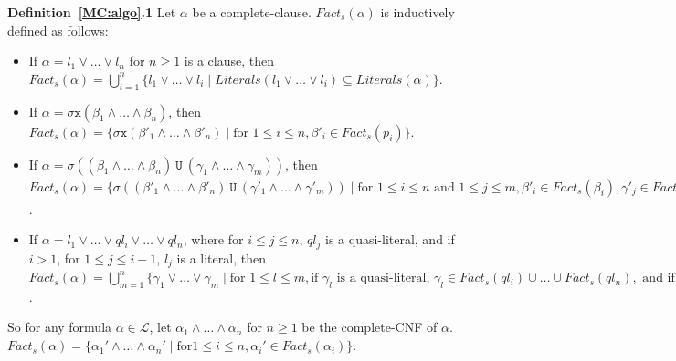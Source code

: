 \documentclass{entcs}
\begin{document}
\noindent\textbf{Definition~\ref{MC:algo}.1} Let $\alpha$ be a
complete-clause. $Fact_{s}(\alpha)$ is inductively defined as
follows:\small
\begin{itemize}
\item If $\alpha=l_1\vee\ldots\vee l_n$ for $n\geq 1$ is a clause,
then $Fact_s(\alpha)=\bigcup\limits_{i=1}^n\{ l_1\vee\ldots\vee
l_i\; |\; Literals(l_1\vee\ldots\vee l _i)\subseteq
Literals(\alpha) \}$. \item If
$\alpha=\sigma\texttt{x}(\beta_1\wedge\ldots\wedge \beta_n)$, then
$Fact_s(\alpha)=\{\sigma\texttt{x}(\beta'_1\wedge\ldots\wedge
\beta'_n)\; |\; \mbox{for }1\leq i\leq n, \beta'_i \in
Fact_s(p_i)\}$. \item If $\alpha=\sigma((\beta_1\wedge\ldots\wedge
\beta_n)\ \texttt{U}\ (\gamma_1\wedge\ldots\wedge \gamma_m))$,
then $Fact_s(\alpha)= \{\sigma((\beta'_1\wedge\ldots\wedge
\beta'_n)\ \texttt{U}\ (\gamma'_1\wedge\ldots\wedge \gamma'_m))\;
|\; \mbox{for }1\leq i\leq n \mbox{ and }1\leq j\leq m,
\beta'_i\in Fact_s(\beta_i),\gamma'_j\in Fact_s(\gamma_j)\}$.
\item If $\alpha=l_1\vee\ldots\vee ql_i\vee\ldots\vee ql_n$, where
for $i\leq j\leq n$, $ql_j$ is a quasi-literal, and if $i>1$, for
$1\leq j\leq i-1$, $l_j$ is a literal, then
$Fact_s(\alpha)=\bigcup\limits_{m=1}^n\{
\gamma_1\vee\ldots\vee\gamma_m\; |\; \mbox{for }1\leq l\leq
m,\mbox{if $\gamma_l$ is a quasi-literal, } \gamma_l\in
Fact_s(ql_i)\cup \ldots\cup Fact_s(ql_n),\mbox{ and if $\gamma_l$
is a literal, }\exists k.1\leq k<i, \gamma_l=l_k\}$.
\end{itemize}\normalsize
So for any formula $\alpha\in\mathcal{L}$, let
$\alpha_1\wedge\ldots\wedge\alpha_n$ for $n\geq 1$ be the
complete-CNF of $\alpha$.
$Fact_s(\alpha)=\{\alpha_1'\wedge\ldots\wedge\alpha_n'\;|\;\mbox{for
}1\leq i\leq n,\alpha_i'\in Fact_s(\alpha_i) \}$.\\
\end{document}
